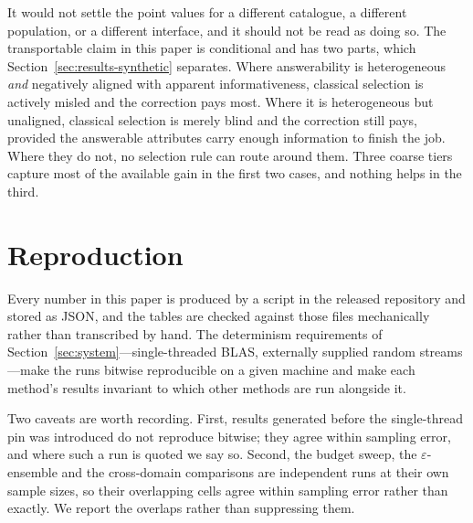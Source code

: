 It would not settle the point values for a different catalogue, a different
population, or a different interface, and it should not be read as doing so.
The transportable claim in this paper is conditional and has two parts, which
Section~\ref{sec:results-synthetic} separates. Where answerability is
heterogeneous \emph{and} negatively aligned with apparent informativeness,
classical selection is actively misled and the correction pays most. Where it
is heterogeneous but unaligned, classical selection is merely blind and the
correction still pays, provided the answerable attributes carry enough
information to finish the job. Where they do not, no selection rule can route
around them. Three coarse tiers capture most of the available gain in the first
two cases, and nothing helps in the third.

\section{Reproduction}
\label{app:repro}

Every number in this paper is produced by a script in the released repository
and stored as JSON, and the tables are checked against those files
mechanically rather than transcribed by hand. The determinism requirements of
Section~\ref{sec:system}---single-threaded BLAS, externally supplied random
streams---make the runs bitwise reproducible on a given machine and make each
method's results invariant to which other methods are run alongside it.

Two caveats are worth recording. First, results generated before the
single-thread pin was introduced do not reproduce bitwise; they agree within
sampling error, and where such a run is quoted we say so. Second, the budget
sweep, the $\varepsilon$-ensemble and the cross-domain comparisons are
independent runs at their own sample sizes, so their overlapping cells agree
within sampling error rather than exactly. We report the overlaps rather than
suppressing them.
